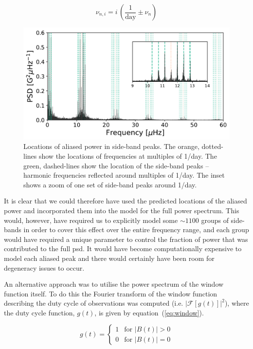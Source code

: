 \begin{equation}
\nu_{n, i} = i \, (\frac{1}{\mathrm{day}} \pm \nu_{n})
\label{eq:sidebands}
\end{equation}

\begin{figure}[ht!]
	\centering
	\includegraphics[width=\columnwidth]{sideband.pdf}
	\caption{Locations of aliased power in side-band peaks. The orange, dotted-lines show the locations of frequencies at multiples of 1/day. The green, dashed-lines show the location of the side-band peaks -- harmonic frequencies reflected around multiples of 1/day.  The inset shows a zoom of one set of side-band peaks around 1/day.}
	\label{fig:sideband_locations}
\end{figure}


It is clear that we could therefore have used the predicted locations of the aliased power and incorporated them into the model for the full power spectrum. This would, however, have required us to explicitly model some $\sim 1100$ groups of side-bands in order to cover this effect over the entire frequency range, and each group would have required a unique parameter to control the fraction of power that was contributed to the full \gls{psd}. It would have become computationally expensive to model each aliased peak and there would certainly have been room for degeneracy issues to occur.

An alternative approach was to utilise the power spectrum of the window function itself. To do this the Fourier transform of the window function describing the duty cycle of observations was computed (i.e. $\left|\mathcal{F}\left[g(t)\right]\right|^2$), where the duty cycle function, $g(t)$, is given by equation~(\ref{eq:window}).

\begin{equation}
g(t) = 
\begin{cases} 
1 & \text{for } |B(t)| > 0 \\
0       & \text{for } |B(t)| = 0
\end{cases}
\label{eq:window}
\end{equation}

